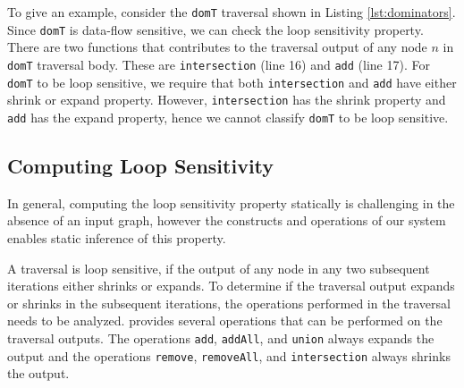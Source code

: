 To give an example, consider the \lstinline|domT| traversal shown in Listing
\ref{lst:dominators}. Since \lstinline|domT| is data-flow sensitive, we can
check the loop sensitivity property. There are two functions that contributes to
the traversal output of any node $n$ in \lstinline|domT| traversal body. These
are \lstinline|intersection| (line 16) and \lstinline|add| (line 17). For
\lstinline|domT| to be loop sensitive, we require that both
\lstinline|intersection| and \lstinline|add| have either shrink or expand
property. However, \lstinline|intersection| has the shrink property and
\lstinline|add| has the expand property, hence we cannot classify
\lstinline|domT| to be loop sensitive.


\subsection{Computing Loop Sensitivity}
\label{sec:ls-algo}
In general, computing the loop sensitivity property statically is challenging in
the absence of an input graph, however the constructs and operations of our
system enables static inference of this property.

A traversal is loop sensitive, if the output of any node in any two subsequent
iterations either shrinks or expands. 
To determine if the traversal output expands or shrinks in the subsequent
iterations, the operations performed in the traversal needs to be analyzed.
 provides several operations that can be performed on the
traversal outputs. The operations \lstinline|add|, \lstinline|addAll|,
and \lstinline|union| always expands the output and the operations
\lstinline|remove|, \lstinline|removeAll|, and \lstinline|intersection| always
shrinks the output.
% 


